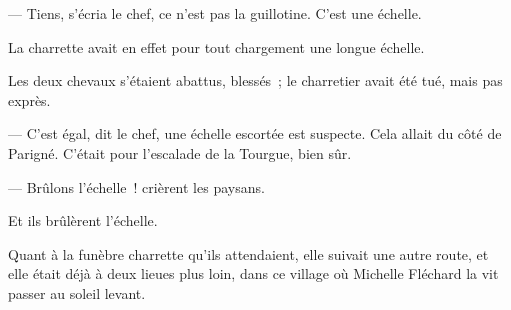 \documentclass[french,twoside]{book} %
\begin{document}
— Tiens, s’écria le chef, ce n’est pas la guillotine. C’est une échelle.\par
La charrette avait en effet pour tout chargement une longue échelle.\par
Les deux chevaux s’étaient abattus, blessés ; le charretier avait été tué, mais pas exprès.\par
— C’est égal, dit le chef, une échelle escortée est suspecte. Cela allait du côté de Parigné. C’était pour l’escalade de la Tourgue, bien sûr.\par
— Brûlons l’échelle ! crièrent les paysans.\par
Et ils brûlèrent l’échelle.\par
Quant à la funèbre charrette qu’ils attendaient, elle suivait une autre route, et elle était déjà à deux lieues plus loin, dans ce village où Michelle Fléchard la vit passer au soleil levant.
\end{document}
